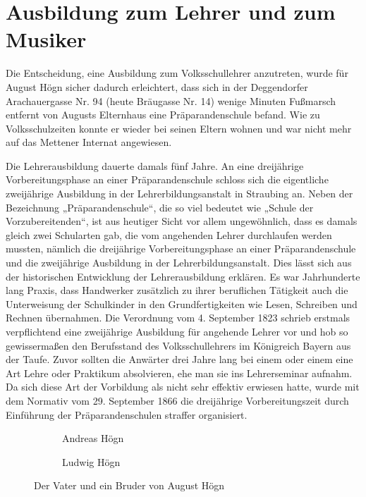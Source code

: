 \section{Ausbildung zum Lehrer und zum Musiker}

Die Entscheidung, eine Ausbildung zum Volksschullehrer anzutreten, wurde
für August Högn sicher dadurch erleichtert, dass sich in der
Deggendorfer Arachauergasse Nr. 94 (heute Bräugasse Nr. 14) wenige
Minuten Fußmarsch entfernt von Augusts Elternhaus eine
Präparandenschule befand. Wie zu Volksschulzeiten konnte er wieder bei
seinen Eltern wohnen und war nicht mehr auf das Mettener Internat
angewiesen.

Die Lehrerausbildung dauerte damals fünf Jahre. An eine dreijährige
Vorbereitungsphase an einer Präparandenschule schloss sich die
eigentliche zweijährige Ausbildung in der Lehrerbildungsanstalt in
Straubing an. Neben der Bezeichnung „Präparandenschule“, die so viel
bedeutet wie „Schule der Vorzubereitenden“, ist aus heutiger Sicht
vor allem ungewöhnlich, dass es damals gleich zwei Schularten gab, die
vom angehenden Lehrer durchlaufen werden mussten, nämlich die
dreijährige Vorbereitungsphase an einer Präparandenschule und die
zweijährige Ausbildung in der Lehrerbildungsanstalt. Dies lässt sich
aus der historischen Entwicklung der Lehrerausbildung erklären. Es war
Jahrhunderte lang Praxis, dass Handwerker zusätzlich zu ihrer
beruflichen Tätigkeit auch die Unterweisung der Schulkinder in den
Grundfertigkeiten wie Lesen, Schreiben und Rechnen übernahmen. Die
Verordnung vom 4. September 1823 schrieb erstmals verpflichtend eine
zweijährige Ausbildung für angehende Lehrer vor und hob so
gewissermaßen den Berufsstand des Volksschullehrers im Königreich
Bayern aus der Taufe. Zuvor sollten die Anwärter drei Jahre lang bei
einem  oder einem
 eine Art Lehre oder
Praktikum absolvieren, ehe man sie ins Lehrerseminar aufnahm. Da sich
diese Art der Vorbildung als nicht sehr effektiv erwiesen hatte, wurde
mit dem Normativ vom 29. September 1866 die dreijährige
Vorbereitungszeit durch Einführung der Präparandenschulen straffer
organisiert.

\begin{figure}
\begin{subfigure}[b]{0.5\linewidth}
\centering
{}
\caption{Andreas Högn}
\end{subfigure}
\begin{subfigure}[b]{0.5\linewidth}
\centering
{}
\caption{Ludwig Högn}
\end{subfigure}
\caption{Der Vater und ein Bruder von August Högn}
\end{figure}


